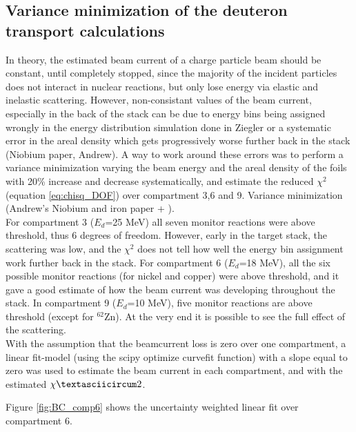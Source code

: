\subsection{Variance minimization of the deuteron transport calculations}
In theory, the estimated beam current of a charge particle beam should be constant, until completely stopped, since the majority of the incident particles does not interact in nuclear reactions, but only lose energy via elastic and inelastic scattering. However, non-consistant values of the beam current, especially in the back of the stack can be due to energy bins being assigned wrongly in the energy distribution simulation done in Ziegler or a systematic error in the areal density which gets progressively worse further back in the stack (Niobium paper, Andrew). A way to work around these errors was to perform a variance minimization varying the beam energy and the areal density of the foils with 20\% increase and decrease systematically, and estimate the reduced $\chi^2$ (equation \ref{eq:chisq_DOF}) over compartment 3,6 and 9. Variance minimization (Andrew's Niobium and iron paper + ). \\

 For compartment 3 ($E_d$=25 MeV) all seven monitor reactions were above threshold,  thus 6 degrees of freedom.  However,  early in the target stack,  the scattering was low, and the $\chi^2$ does not tell how well the energy bin assignment work further back in the stack.  For compartment 6 ($E_d$=18 MeV), all the six possible monitor reactions (for nickel and copper) were above threshold, and it gave a good estimate of how the beam current was developing throughout the stack.  In compartment 9 ($E_d$=10 MeV), five monitor reactions are above threshold (except for $^{62}$Zn).  At the very end it is possible to see the full effect of the scattering.\\

With the assumption that the beamcurrent loss is zero over one compartment, a linear fit-model (using the scipy optimize curvefit function) with a slope equal to zero was used to estimate the beam current in each compartment, and with the estimated $\chiˆ2$.  

Figure \ref{fig:BC_comp6} shows the uncertainty weighted linear fit over compartment 6. 

